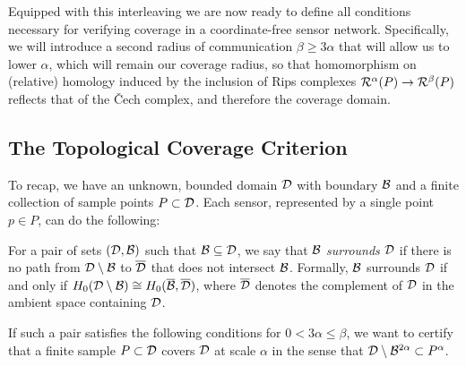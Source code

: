 Equipped with this interleaving we are now ready to define all conditions necessary for verifying coverage in a coordinate-free sensor network.
Specifically, we will introduce a second radius of communication $\beta\geq 3\alpha$ that will allow us to lower $\alpha$, which will remain our coverage radius, so that homomorphism on (relative) homology induced by the inclusion of Rips complexes $\mathcal{R}^\alpha(P)\to\mathcal{R}^\beta(P)$ reflects that of the \v Cech complex, and therefore the coverage domain.

\subsection{The Topological Coverage Criterion}

To recap, we have an unknown, bounded domain ${\mathcal{D}}$ with boundary ${\mathcal{B}}$ and a finite collection of sample points $P\subset{\mathcal{D}}$.
Each sensor, represented by a single point $p\in P$, can do the following:

\vspace{3ex}
\begin{center}
\setlength{\fboxsep}{2ex}
\end{center}\vspace{3ex}

\begin{definition}
    For a pair of sets $({\mathcal{D}}, {\mathcal{B}})$ such that ${\mathcal{B}}\subseteq {\mathcal{D}}$, we say that ${\mathcal{B}}$ \emph{surrounds} ${\mathcal{D}}$ if there is no path from ${\mathcal{D}}\setminus{\mathcal{B}}$ to $\overline{{\mathcal{D}}}$ that does not intersect ${\mathcal{B}}$.
    Formally, ${\mathcal{B}}$ surrounds ${\mathcal{D}}$ if and only if $H_0({\mathcal{D}}\setminus {\mathcal{B}}) \cong H_0(\overline{{\mathcal{B}}}, \overline{{\mathcal{D}}})$, where $\overline{{\mathcal{D}}}$ denotes the complement of ${\mathcal{D}}$ in the ambient space containing ${\mathcal{D}}$.
\end{definition}

If such a pair satisfies the following conditions for $0 < 3\alpha\leq \beta$, we want to certify that a finite sample $P\subset{\mathcal{D}}$ covers ${\mathcal{D}}$ at scale $\alpha$ in the sense that ${\mathcal{D}}\setminus{\mathcal{B}}^{2\alpha}\subset P^\alpha$.


